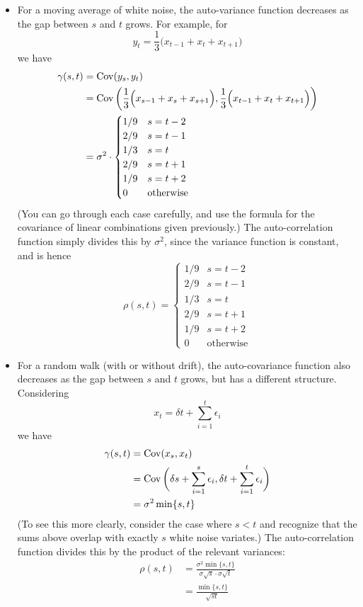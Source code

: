 \documentclass{article}
\begin{document}
\begin{itemize}
\item For a moving average of white noise, the auto-variance function decreases
  as the gap between $s$ and $t$ grows. For example, for  
  \[
  y_t = \frac{1}{3} \Big( x_{t-1} + x_t + x_{t+1} \Big)
  \]
  we have
  \begin{align*}
  \gamma(s,t) &= \operatorname{Cov}(y_s, y_t) \\
  &= \operatorname{Cov} \bigg( \frac{1}{3} \Big( x_{s-1} + x_s + x_{s+1} \Big), 
    \frac{1}{3} \Big( x_{t-1} + x_t + x_{t+1} \Big) \bigg) \\
  &=  \sigma^2 \cdot 
  \begin{cases}
  1 / 9 & s = t-2 \\
  2 / 9 & s = t-1 \\
  1 / 3 & s = t \\
  2 / 9 & s = t+1 \\
  1 / 9 & s = t+2 \\
  0 & \text{otherwise}
  \end{cases}
  \end{align*}
  (You can go through each case carefully, and use the formula for the
  covariance of linear combinations given previously.) The auto-correlation
  function simply divides this by $\sigma^2$, since the variance function is 
  constant, and is hence
  \[
  \rho(s,t) = 
  \begin{cases}
  1 / 9 & s = t-2 \\
  2 / 9 & s = t-1 \\
  1 / 3 & s = t \\
  2 / 9 & s = t+1 \\
  1 / 9 & s = t+2 \\
  0 & \text{otherwise}
  \end{cases}
  \]

\item For a random walk (with or without drift), the auto-covariance function
  also decreases as the gap between $s$ and $t$ grows, but has a different 
  structure. Considering 
  \[
  x_t = \delta t + \sum_{i=1}^t \epsilon_i
  \]
  we have
  \begin{align*}
  \gamma(s,t) &= \operatorname{Cov}(x_s, x_t) \\
  &= \operatorname{Cov} \bigg( \delta s + \sum_{i=1}^s \epsilon_i, 
  \delta t + \sum_{i=1}^t \epsilon_i \bigg) \\
  &= \sigma^2 \min\{s, t\}
  \end{align*}
  (To see this more clearly, consider the case where $s<t$ and recognize that 
  the sums above overlap with exactly $s$ white noise variates.) The
  auto-correlation function divides this by the product of the relevant
  variances: 
  \begin{align*}
  \rho(s,t) &= \frac{\sigma^2 \min\{s, t\}}{\sigma \sqrt{s} \cdot \sigma 
              \sqrt{t}} \\  
  &= \frac{\min\{s, t\}}{\sqrt{st}}
  \end{align*}


\end{itemize}
\end{document}
